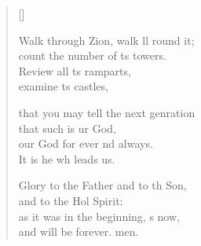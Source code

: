 \begin{verse}[\versewidth]
\begin{patverse}
Walk through Zion, walk ll round it;\Med\\
count the number of \pointup{\i}ts towers.\\
Review all \pointup{\i}ts ramparts,\Med\\
examine \pointup{\i}ts castles,

that you may tell the next genration\Med\\
that such is ur God,\\
our God for ever nd always.\Med\\
It is he wh leads us.

Glory to the Father and to th Son,\Med\\
and to the Hol Spirit:\\
as it was in the beginning, \pointup{\i}s now,\Med\\
and will be forever. men. 
  \end{patverse}
\end{verse}
